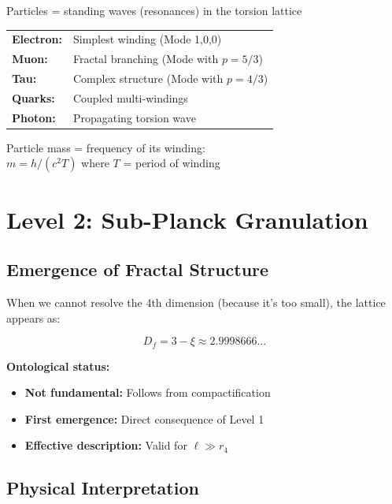 	\begin{important}
		Particles = standing waves (resonances) in the torsion lattice
		
		\vspace{0.3cm}
		
		\begin{tabular}{ll}
			\textbf{Electron:} & Simplest winding (Mode 1,0,0)\\
			\textbf{Muon:} & Fractal branching (Mode with $p=5/3$)\\
			\textbf{Tau:} & Complex structure (Mode with $p=4/3$)\\
			\textbf{Quarks:} & Coupled multi-windings\\
			\textbf{Photon:} & Propagating torsion wave\\
		\end{tabular}
		
		\vspace{0.3cm}
		
		Particle mass = frequency of its winding:\\
		$m = h/(c^2 T)$ where $T$ = period of winding
	\end{important}
	
	\section{Level 2: Sub-Planck Granulation}
	
	\subsection{Emergence of Fractal Structure}
	
	When we cannot resolve the 4th dimension (because it's too small), the lattice appears as:
	
	\begin{equation}
		\boxed{D_f = 3 - \xi \approx 2.9998666...}
	\end{equation}
	
	\textbf{Ontological status:}
	\begin{itemize}
		\item \textbf{Not fundamental:} Follows from compactification
		\item \textbf{First emergence:} Direct consequence of Level 1
		\item \textbf{Effective description:} Valid for $\ell \gg r_4$
	\end{itemize}
	
	\subsection{Physical Interpretation}
	
